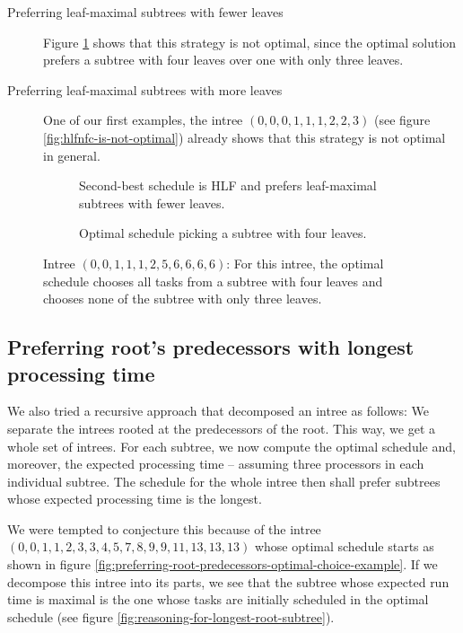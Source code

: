\begin{description}
\item [Preferring leaf-maximal subtrees with fewer leaves] Figure \ref{fig:subtree-with-fewest-leaves-suboptimal} shows that this strategy is not optimal, since the optimal solution prefers a subtree with four leaves over one with only three leaves.
\item [Preferring leaf-maximal subtrees with more leaves] One of our first examples, the intree $(0,0,0,1,1,1,2,2,3)$ (see figure \ref{fig:hlfnfc-is-not-optimal}) already shows that this strategy is not optimal in general.
\end{description}

\begin{figure}[ht]
  \centering
  \begin{subfigure}{.45\textwidth}
    \centering
    
    \caption{Second-best schedule is HLF and prefers leaf-maximal subtrees with fewer leaves.}
  \end{subfigure}
  \quad
  \begin{subfigure}{.45\textwidth}
    \centering
    
    \caption{Optimal schedule picking a subtree with four leaves.}
  \end{subfigure}
\caption{Intree $(0, 0, 1, 1, 1, 2, 5, 6, 6, 6, 6)$: For this intree, the optimal schedule chooses all tasks from a subtree with four leaves and chooses none of the subtree with only three leaves.}
  \label{fig:subtree-with-fewest-leaves-suboptimal}
\end{figure}


\subsection{Preferring root's predecessors with longest processing time}
\label{sec:suboptimal-hlf-can-roots-longest-predecessors}

We also tried a recursive approach that decomposed an intree as follows: We separate the intrees rooted at the predecessors of the root. This way, we get a whole set of intrees. For each subtree, we now compute the optimal schedule and, moreover, the expected processing time -- assuming three processors in each individual subtree. The schedule for the whole intree then shall prefer subtrees whose expected processing time is the longest.

We were tempted to conjecture this because of the intree $(0,0,1,1,2,3,3,4,5,7,8,9,9,11,13,13,13)$ whose optimal schedule starts as shown in figure \ref{fig:preferring-root-predecessors-optimal-choice-example}. If we decompose this intree into its parts, we see that the subtree whose expected run time is maximal is the one whose tasks are initially scheduled in the optimal schedule (see figure \ref{fig:reasoning-for-longest-root-subtree}).

